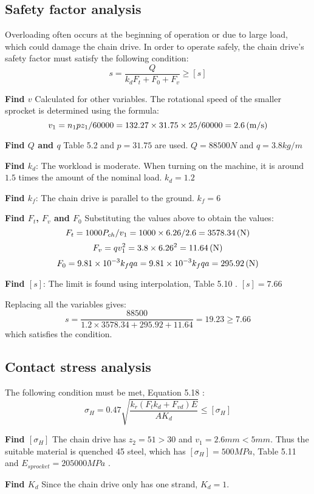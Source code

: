 \subsection{Safety factor analysis}
Overloading often occurs at the beginning of operation or due to large load, which could damage the chain drive. In order to operate safely, the chain drive's safety factor must satisfy the following condition:
\[s = \dfrac{Q}{k_dF_t+F_0+F_v} \geq [s]\]

\textbf{Find $ v $} Calculated for other variables. The rotational speed of the smaller sprocket is determined using the formula:
\[	v_1={n_1pz_1}/{60000}= {132.27\times 31.75 \times 25}/{60000} = 2.6 \, (\mathrm{m/s})\]

\textbf{Find $ Q $ and $ q $} Table 5.2 \cite{tk1} and $ p =31.75$ are used. $ Q=88500 \unit{N}$ and $ q=3.8\unit{kg/m} $

\textbf{Find $ k_d $}: The workload is moderate. When turning on the machine, it is around $ 1.5 $ times the amount of the nominal load. $ k_d = 1.2 $

\textbf{Find $ k_f $}: The chain drive is parallel to the ground. $ k_f = 6 $

\textbf{Find $ F_t $, $ F_v $ and $ F_0 $} Substituting the values above to obtain the values:
\[	F_t = {1000P_{ch}}/{v_1} = {1000\times 6.26}/{2.6} = 3578.34 \, (\mathrm{N})\]
\[	F_v =qv_1^2= 3.8\times 6.26^2 = 11.64 \, (\mathrm{N})\]
\[	F_0 =9.81\times10^{-3}k_fqa = 9.81\times10^{-3}k_fqa = 295.92\, (\mathrm{N})\]

\textbf{Find $ [s] $}: The limit is found using interpolation, Table 5.10 \cite{tk1}.  $ [s] =7.66$

Replacing all the variables gives:
\[s=\dfrac{88500}{1.2\times 3578.34+295.92+11.64}=19.23\geq 7.66\]
which satisfies the condition.

\subsection{Contact stress analysis}
The following condition must be met, Equation 5.18 \cite{tk1}:
\[\sigma_H = 0.47\sqrt{\dfrac{k_r(F_tk_d+F_{vd})E}{AK_d}}\leq[\sigma_H]\]

\textbf{Find $ [\sigma_H] $} The chain drive has $ z_2=51>30 $ and $ v_1=2.6\unit{mm}<5 \unit{mm} $. Thus the suitable material is quenched 45 steel, which has $ [\sigma_H] = 500 \unit{MPa} $, Table 5.11 \cite{tk1} and $ E_{sprocket} = 205000 \unit{MPa}$ \cite{Mareau2013ExperimentalAN}.

\textbf{Find $ K_d $} Since the chain drive only has one strand, $ K_d = 1$.

